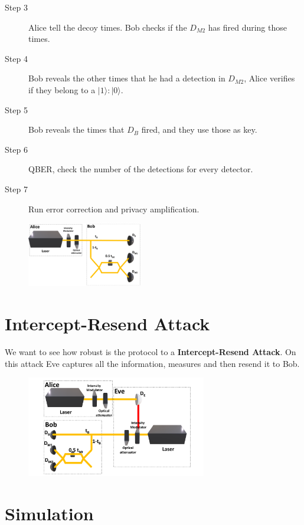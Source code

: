\documentclass[1000pt]{article}
\newcommand{\mysection}[1]{\section*{\color{black}\sffamily #1}}%
\begin{document}
\begin{description}

\item [Step 3] Alice tell the decoy times. Bob checks if the \textbf{$D_{M2}$} has fired during those times.

\item [Step 4] Bob reveals the other times that he had a detection in \textbf{$D_{M2}$}, Alice verifies if they belong to a $|1\rangle:|0\rangle$.

\item [Step 5] Bob reveals the times that $D_B$ fired, and they use those as key.

\item [Step 6] QBER, check the number of the detections for every detector.

\item [Step 7] Run error correction and privacy amplification.
\end{description}
\begin{figure}[hbt]
    	\centering
    	\includegraphics[width=0.45\textwidth]{./figures/Full2.pdf}
    \end{figure}

\mysection{\Huge\textbf{Intercept-Resend Attack}} \Large \vspace*{1cm}

We want to see how robust is the protocol to a \textbf{Intercept-Resend Attack}. On this attack Eve captures all the information, measures and then resend it to Bob.

\begin{figure}[hbt]
    	\centering
    	\includegraphics[width=0.7\textwidth]{./figures/E.pdf}
\end{figure}
\mysection{\Huge\textbf{Simulation}} \Large \vspace*{1cm}
\end{document}
